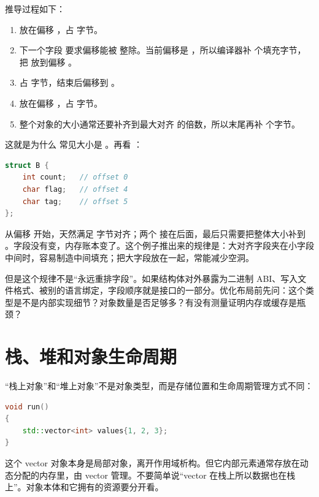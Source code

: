 推导过程如下：

\begin{enumerate}
  \item {} 放在偏移 ，占  字节。
  \item 下一个字段  要求偏移能被  整除。当前偏移是 ，所以编译器补  个填充字节，把  放到偏移 。
  \item {} 占  字节，结束后偏移到 。
  \item {} 放在偏移 ，占  字节。
  \item 整个对象的大小通常还要补齐到最大对齐  的倍数，所以末尾再补  个字节。
\end{enumerate}

这就是为什么  常见大小是 。再看 ：

\begin{lstlisting}[language=C++,caption={把大对齐字段提前}]
struct B {
    int count;   // offset 0
    char flag;   // offset 4
    char tag;    // offset 5
};
\end{lstlisting}

 从偏移  开始，天然满足  字节对齐；两个  接在后面，最后只需要把整体大小补到 。字段没有变，内存账本变了。这个例子推出来的规律是：大对齐字段夹在小字段中间时，容易制造中间填充；把大字段放在一起，常能减少空洞。

但是这个规律不是“永远重排字段”。如果结构体对外暴露为二进制 ABI、写入文件格式、被别的语言绑定，字段顺序就是接口的一部分。优化布局前先问：这个类型是不是内部实现细节？对象数量是否足够多？有没有测量证明内存或缓存是瓶颈？

\section{栈、堆和对象生命周期}

“栈上对象”和“堆上对象”不是对象类型，而是存储位置和生命周期管理方式不同：

\begin{lstlisting}[language=C++,caption={自动存储期对象}]
void run()
{
    std::vector<int> values{1, 2, 3};
}
\end{lstlisting}

 这个 vector 对象本身是局部对象，离开作用域析构。但它内部元素通常存放在动态分配的内存里，由 vector 管理。不要简单说“vector 在栈上所以数据也在栈上”。对象本体和它拥有的资源要分开看。

